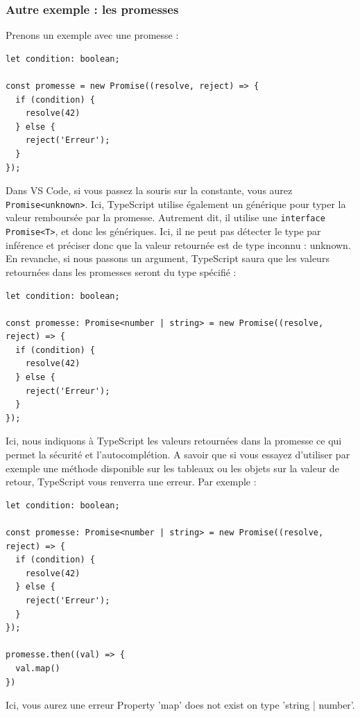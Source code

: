 \subsubsection{Autre exemple : les promesses}
Prenons un exemple avec une promesse :
\begin{verbatim}
let condition: boolean;

const promesse = new Promise((resolve, reject) => {
  if (condition) {
    resolve(42)
  } else {
    reject('Erreur');
  }
});
\end{verbatim}
Dans {\color{monOrange}VS Code}, si vous passez la souris sur la constante, vous aurez {\tt Promise<unknown>}. Ici, {\color{monOrange}TypeScript} utilise également un générique pour typer la valeur remboursée par la promesse. Autrement dit, il utilise une {\tt interface Promise<T>}, et donc les génériques. Ici, il ne peut pas détecter le type par inférence et préciser donc que la valeur retournée est de type inconnu : {\color{monOrange}unknown}. En revanche, si nous passons un argument, {\color{monOrange}TypeScript} saura que les valeurs retournées dans les promesses seront du type spécifié :
\begin{verbatim}
let condition: boolean;

const promesse: Promise<number | string> = new Promise((resolve, reject) => {
  if (condition) {
    resolve(42)
  } else {
    reject('Erreur');
  }
});
\end{verbatim}
Ici, nous indiquons à {\color{monOrange}TypeScript} les valeurs retournées dans la promesse ce qui permet la sécurité et l'autocomplétion. A savoir que si vous essayez d'utiliser par exemple une méthode disponible sur les tableaux ou les objets sur la valeur de retour, {\color{monOrange}TypeScript} vous renverra une erreur. Par exemple :
\begin{verbatim}
let condition: boolean;

const promesse: Promise<number | string> = new Promise((resolve, reject) => {
  if (condition) {
    resolve(42)
  } else {
    reject('Erreur');
  }
});

promesse.then((val) => {
  val.map()
})
\end{verbatim}
Ici, vous aurez une erreur {\color{red}Property 'map' does not exist on type 'string | number'}.

